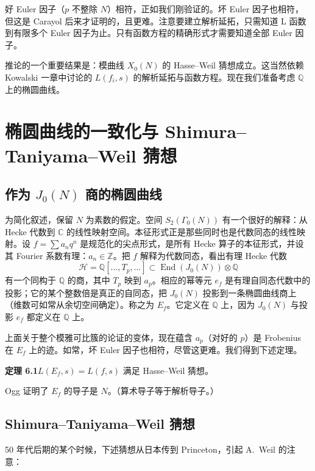 好 Euler 因子（$p$ 不整除 $N$）相符，正如我们刚验证的。坏 Euler 因子也相符，但这是 Carayol 后来才证明的，且更难。注意要建立解析延拓，只需知道 L 函数到有限多个 Euler 因子为止。只有函数方程的精确形式才需要知道全部 Euler 因子。

推论的一个重要结果是：模曲线 $X_0(N)$ 的 Hasse--Weil 猜想成立。这当然依赖 Kowalski 一章中讨论的 $L(f_i,s)$ 的解析延拓与函数方程。现在我们准备考虑 $\mathbb{Q}$ 上的椭圆曲线。
\section{椭圆曲线的一致化与 Shimura--Taniyama--Weil 猜想}\label{c5:sec:6}

\subsection{作为 $J_0(N)$ 商的椭圆曲线}\label{c5:sec:6.1}

为简化叙述，保留 $N$ 为素数的假定。空间 $S_2(\Gamma_0(N))$ 有一个很好的解释：从 Hecke 代数到 $\mathbb{C}$ 的线性映射空间。本征形式正是那些同时也是代数同态的线性映射。设 $f=\sum a_nq^n$ 是规范化的尖点形式，是所有 Hecke 算子的本征形式，并设其 Fourier 系数有理：$a_n\in\mathbb{Z}$。把 $f$ 解释为代数同态，看出有理 Hecke 代数
\begin{equation}\tag{6.1}\label{c5:eq:6.1}
\mathcal{H}=\mathbb{Q}[\dots,T_p,\dots]\subset\operatorname{End}(J_0(N))\otimes\mathbb{Q}
\end{equation}
有一个同构于 $\mathbb{Q}$ 的商，其中 $T_p$ 映到 $a_p$。相应的幂等元 $e_f$ 是有理自同态代数中的投影；它的某个整数倍是真正的自同态，把 $J_0(N)$ 投影到一条椭圆曲线商上（维数可如常从余切空间确定）。称之为 $E_f$。它定义在 $\mathbb{Q}$ 上，因为 $J_0(N)$ 与投影 $e_f$ 都定义在 $\mathbb{Q}$ 上。

上面关于整个模雅可比簇的论证的变体，现在蕴含 $a_p$（对好的 $p$）是 Frobenius 在 $E_f$ 上的迹。如常，坏 Euler 因子也相符，尽管这更难。我们得到下述定理。

\par\medskip\noindent\textbf{定理 6.1}\quad $L(E_f,s)=L(f,s)$ 满足 Hasse--Weil 猜想。

Ogg 证明了 $E_f$ 的导子是 $N$。（算术导子等于解析导子。）

\subsection{Shimura--Taniyama--Weil 猜想}\label{c5:sec:6.2}

50 年代后期的某个时候，下述猜想从日本传到 Princeton，引起 A.~Weil 的注意：

